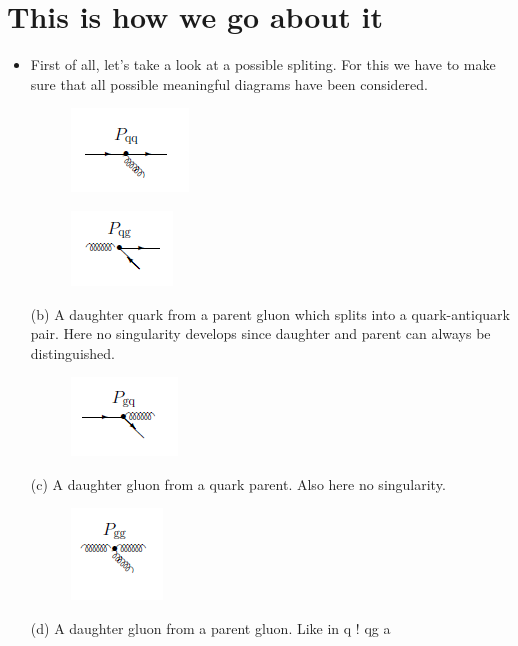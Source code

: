\section*{This is how we go about it}
\begin{itemize}
\item First of all, let's take a look at a possible spliting. For this we have to make sure that all possible meaningful diagrams have been considered. 
\begin{figure}[h!]
\centering
\includegraphics[scale=0.7]{images/Intro/pqq.png}
\end{figure}

\begin{figure}[h!]
\centering
\includegraphics[scale=0.7]{images/Intro/pqg.png}
\end{figure}
(b) A daughter quark from a parent gluon which splits into a
quark-antiquark pair. Here no singularity develops since daughter
and parent can always be distinguished.
\begin{figure}[h!]
\centering
\includegraphics[scale=0.7]{images/Intro/pgq.png}
\end{figure}
(c) A daughter gluon from a quark parent. Also here no singularity.

\begin{figure}[h!]
\centering
\includegraphics[scale=0.7]{images/Intro/pgg.png}
\end{figure}
(d) A daughter gluon from a parent gluon. Like in q ! qg a


\end{itemize}
